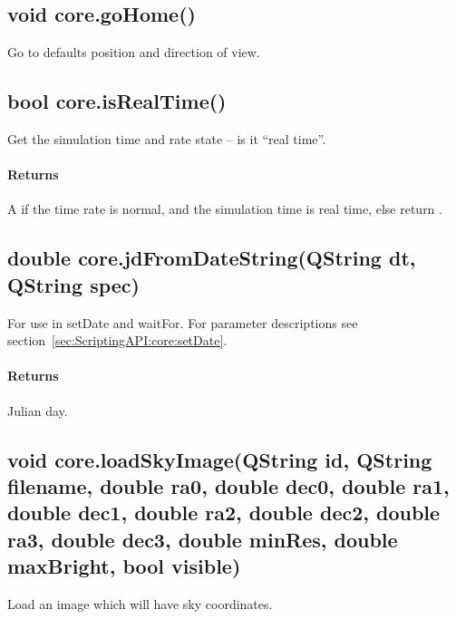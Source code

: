 \subsection{void core.goHome()}
\label{sec:ScriptingAPI:core:goHome}
Go to defaults position and direction of view.

\subsection{bool core.isRealTime()}
\label{sec:ScriptingAPI:core:isRealTime}
Get the simulation time and rate state -- is it ``real time''.

\paragraph{Returns}
A  if the time rate is normal, and the simulation time is real time, else return .

\subsection{double core.jdFromDateString(QString dt, QString spec)}
\label{sec:ScriptingAPI:core:jdFromDateString}
For use in setDate and waitFor. For parameter descriptions see section~\ref{sec:ScriptingAPI:core:setDate}.

\paragraph{Returns}
Julian day.

\subsection{void core.loadSkyImage(QString id, QString filename, double ra0, double dec0, double ra1, double dec1, double ra2, double dec2, double ra3, double dec3, double minRes, double maxBright, bool visible)}
\label{sec:ScriptingAPI:core:loadSkyImage}
Load an image which will have sky coordinates.

